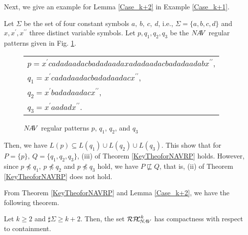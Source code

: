 Next, we give an example for Lemma \ref{Case_k+2} in Example \ref{Case_k+1}.
\begin{ex}\label{Case_k+1}\label{反例k+1}
Let $\Sigma$ be the set of four constant symbols $a,~b,~c,~d$, i.e., $\Sigma= \{a, b, c, d \}$ and $x,x^{\prime},x^{\prime\prime}$ three distinct variable symbols.
Let $p,q_{1},q_{2},q_{3}$ be the $N\!A\!V$ regular patterns given in Fig. \ref{Fig:CounterExampleforNAVR}. 
\begin{figure}[tb]
  \begin{tabular}{l}
$p  = x^{\prime}cadadaadacbadadaadaxadadaadacbadadaadabx^{\prime\prime}$,\\
$q_{1} = x^{\prime}cadadaadacbadadaadacx^{\prime\prime}$,\\
$q_{2} = x^{\prime}badadaadacx^{\prime\prime}$,\\
$q_{3} = x^{\prime}aadadx^{\prime\prime}$.
  \end{tabular}
\caption{$N\!A\!V$ regular patterns $p$, $q_{1}$, $q_{2}$, and $q_{3}$}\label{Fig:CounterExampleforNAVR}
\end{figure}
\noindent
Then, we have  $L(p) \subseteq L(q_{1}) \cup L(q_{2}) \cup L(q_{3})$.
This show that for $P=\{p\},~Q=\{q_{1},q_{2},q_{3}\}$, (iii) of Theorem \ref{KeyTheoforNAVRP} holds.
However, since $p \not \preceq q_{1},~p \not \preceq q_{2}$ and $p \not \preceq q_{3}$ hold,
we have $P \not \sqsubseteq Q$, that is, (ii) of Theorem \ref{KeyTheoforNAVRP} does not hold.
\end{ex}

From Theorem \ref{KeyTheoforNAVRP} and Lemma \ref{Case_k+2}, we have the following theorem.

\begin{thm}\label{MainTheforNAVRP}
Let $k\ge 2$ and $\sharp\Sigma \ge k+2$.
Then, the set $\mathcal{RP\!\!L}^{k}_{\!N\!A\!V}$ has compactness with respect to containment.
\end{thm}
